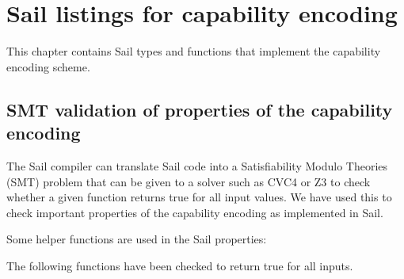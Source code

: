 
\chapter{Sail listings for capability encoding}
\label{chap:sailenc}

This chapter contains Sail types and functions that implement the
capability encoding scheme.

\medskip
{}

\medskip
{}

\medskip
\label{sailRISCVzencCapabilityToCapability}
\sailRISCVfnencCapabilityToCapability

\medskip
\sailRISCVfncapToEncCap

\medskip
\sailRISCVfngetCapBoundsBits

\medskip
\sailRISCVfnsetCapBounds

\medskip
\sailRISCVfnsetCapBoundsRoundDown

\medskip
\sailRISCVfngetRepresentableAlignmentMask

\medskip
\sailRISCVfngetRepresentableLength

\section{SMT validation of properties of the capability encoding}

The Sail compiler can translate Sail code into a Satisfiability Modulo Theories
(SMT) problem that can be given to a solver such as CVC4 or Z3 to check whether
a given function returns true for all input values. We have used this to
check important properties of the capability encoding as implemented in Sail.

Some helper functions are used in the Sail properties:

\medskip
{}

\medskip
{}

The following functions have been checked to return true for all inputs.

\medskip
{}

\medskip
{}

\medskip
{}

\medskip
{}

\medskip
{}

\medskip
{}

\medskip
{}

\medskip
{}